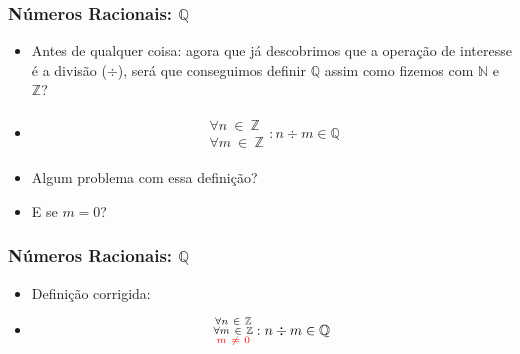\documentclass[usenames,dvipsnames,svgnames]{beamer}
\begin{document}
\begin{frame}
	
	\frametitle{Números Racionais: $\mathbb{Q}$}

	\begin{itemize}
		\item Antes de qualquer coisa: agora que já descobrimos que a operação de interesse é a divisão ($\div$), será que conseguimos definir $\mathbb{Q}$ assim como fizemos com $\mathbb{N}$ e $\mathbb{Z}$?
		\item
		\begin{equation}
		\begin{aligned}
			\substack{\forall n ~\in~ \mathbb{Z} \\ \forall m ~\in~ \mathbb{Z}}: n \div m \in \mathbb{Q}
		\end{aligned}
		\end{equation}
		\item Algum problema com essa definição?
		\item {\color{red} E se $m = 0$?}
	\end{itemize}

\end{frame}

\begin{frame}
	
	\frametitle{Números Racionais: $\mathbb{Q}$}

	\begin{itemize}
		\item Definição corrigida:
		\item
		\begin{equation}
		\begin{aligned}
			\substack{\forall n ~\in~ \mathbb{Z} \\ \forall m ~\in~ \mathbb{Z} \\ {\color{red}m ~\neq~ 0}}: n \div m \in \mathbb{Q}
		\end{aligned}
		\end{equation}
	\end{itemize}

\end{frame}
\end{document}

